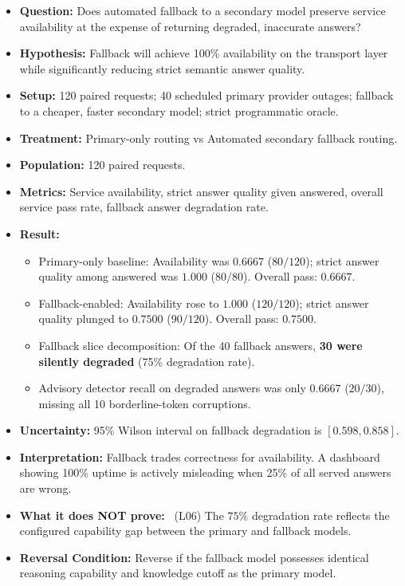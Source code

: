 \begingroup
\small
\begin{itemize}\setlength{\itemsep}{1.2pt}\setlength{\parsep}{0pt}\setlength{\parskip}{0pt}
    \item \textbf{Question:} Does automated fallback to a secondary model preserve service availability at the expense of returning degraded, inaccurate answers?
    \item \textbf{Hypothesis:} Fallback will achieve 100\% availability on the transport layer while significantly reducing strict semantic answer quality.
    \item \textbf{Setup:} 120 paired requests; 40 scheduled primary provider outages; fallback to a cheaper, faster secondary model; strict programmatic oracle.
    \item \textbf{Treatment:} Primary-only routing vs Automated secondary fallback routing.
    \item \textbf{Population:} 120 paired requests.
    \item \textbf{Metrics:} Service availability, strict answer quality given answered, overall service pass rate, fallback answer degradation rate.
    \item \textbf{Result:} \MEASURED
    \begin{itemize}\setlength{\itemsep}{0.8pt}\setlength{\parsep}{0pt}
        \item Primary-only baseline: Availability was $\mathbf{0.6667}$ ($80/120$); strict answer quality among answered was $\mathbf{1.000}$ ($80/80$). Overall pass: $\mathbf{0.6667}$.
        \item Fallback-enabled: Availability rose to $\mathbf{1.000}$ ($120/120$); strict answer quality plunged to $\mathbf{0.7500}$ ($90/120$). Overall pass: $\mathbf{0.7500}$.
        \item Fallback slice decomposition: Of the 40 fallback answers, \textbf{30 were silently degraded} (75\% degradation rate).
        \item Advisory detector recall on degraded answers was only $\mathbf{0.6667}$ ($20/30$), missing all 10 borderline-token corruptions.
    \end{itemize}
    \item \textbf{Uncertainty:} 95\% Wilson interval on fallback degradation is $[0.598, 0.858]$.
    \item \textbf{Interpretation:} Fallback trades correctness for availability. A dashboard showing 100\% uptime is actively misleading when 25\% of all served answers are wrong.
    \item \textbf{What it does NOT prove:} \LIMITATION\ (L06) The $75\%$ degradation rate reflects the configured capability gap between the primary and fallback models.
    \item \textbf{Reversal Condition:} Reverse if the fallback model possesses identical reasoning capability and knowledge cutoff as the primary model.
\end{itemize}
\endgroup

